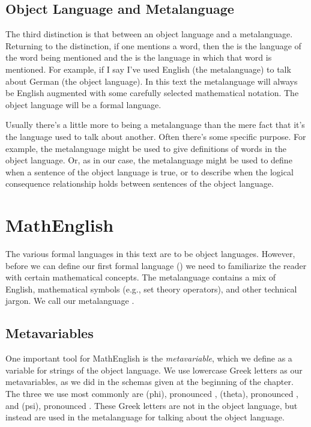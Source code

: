 \subsection{Object Language and Metalanguage}\label{objectandmetalanguage}
The third distinction is that between an object language and a metalanguage. 
Returning to the  distinction, if one mentions a word, then the  is the language of the word being mentioned and the  is the language in which that word is mentioned. 
For example, if I say  I've used English (the metalanguage) to talk about German (the object language). 
In this text the metalanguage will always be English augmented with some carefully selected mathematical notation. 
The object language will be a formal language. 

Usually there's a little more to being a metalanguage than the mere fact that it's the language used to talk about another. 
Often there's some specific purpose. 
For example, the metalanguage might be used to give definitions of words in the object language. Or, as in our case, the metalanguage might be used to define when a sentence of the object language is true, or to describe when the logical consequence relationship holds between sentences of the object language. 

\section{MathEnglish}\label{MathEnglish}

The various formal languages in this text are to be object languages.  However, before we can define our first formal language (\GSL{}) we need to familiarize the reader with certain mathematical concepts.  The metalanguage contains a mix of English, mathematical symbols (e.g., set theory operators), and other technical jargon.  We call our metalanguage .   

\subsection{Metavariables}\label{metavariables}
One important tool for MathEnglish is the \emph{metavariable}, which we define as a variable for strings of the object language.  
We use lowercase Greek letters as our metavariables, as we did in the schemas given at the beginning of the chapter.
The three we use most commonly are \mention{$\CAPPHI$} (phi), pronounced , \mention{$\CAPTHETA$} (theta), pronounced , and \mention{$\CAPPSI$} (psi), pronounced .
These Greek letters are not in the object language, but instead are used in the metalanguage for talking about the object language. 

